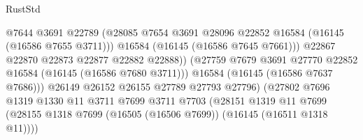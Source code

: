 \begin{lexlean}{RustStd}
\begin{coremodule}
                                              @7644
                                              @3691
                                              @22789
                                              (@28085
                                                @7654
                                                @3691
                                                @28096
                                                @22852
                                                @16584
                                                (@16145 (@16586 @7655 @3711)))
                                              @16584
                                              (@16145 (@16586 @7645 @7661)))
                                            @22867
                                            @22870
                                            @22873
                                            @22877
                                            @22882
                                            @22888))
                                        (@27759
                                          @7679
                                          @3691
                                          @27770
                                          @22852
                                          @16584
                                          (@16145 (@16586 @7680 @3711)))
                                        @16584
                                        (@16145 (@16586 @7637 @7686)))
                                      @26149
                                      @26152
                                      @26155
                                      @27789
                                      @27793
                                      @27796)
                                    (@27802
                                      @7696
                                      @1319
                                      @1330
                                      @11
                                      @3711
                                      @7699
                                      @3711
                                      @7703
                                      (@28151
                                        @1319
                                        @11
                                        @7699
                                        (@28155
                                          @1318
                                          @7699
                                          (@16505 (@16506 @7699))
                                          (@16145 (@16511 @1318 @11))))

\end{coremodule}
\end{lexlean}
